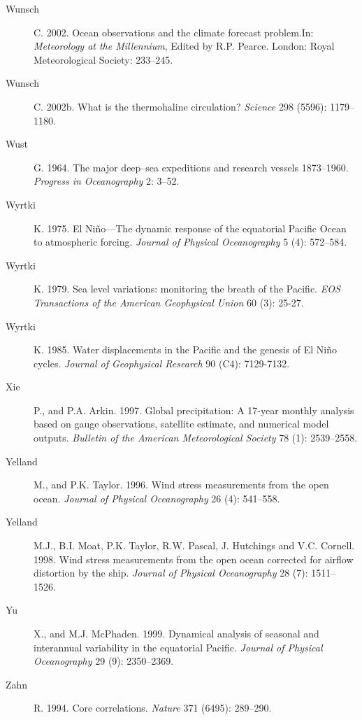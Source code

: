 \begin{description}
\item [Wunsch]C. 2002. Ocean observations and the climate forecast
  problem.In: \textit{Meteorology at the Millennium}, Edited by
  R.P. Pearce. London: Royal Meteorological Society: 233--245.

\item [Wunsch]C. 2002b. What is the thermohaline circulation?
  \textit{Science} 298 (5596): 1179--1180.

\item [Wust]G. 1964. The major deep--sea expeditions and research
  vessels 1873--1960. \textit{Progress in Oceanography} 2: 3--52.

\item [Wyrtki]K. 1975. El Ni\~{n}o---The dynamic response of the
  equatorial Pacific Ocean to atmospheric forcing. \textit{Journal of
    Physical Oceanography} 5 (4): 572--584.

\item [Wyrtki]K. 1979. Sea level variations: monitoring the breath of
  the Pacific. \textit{EOS Transactions of the American Geophysical
    Union} 60 (3): 25-27.

\item [Wyrtki]K. 1985. Water displacements in the Pacific and the
  genesis of El Ni\~{n}o cycles. \textit{Journal of Geophysical
    Research} 90 (C4): 7129-7132.

\item [Xie]P., and P.A. Arkin. 1997. Global precipitation: A 17-year
  monthly analysis based on gauge observations, satellite estimate,
  and numerical model outputs. \textit{ Bulletin of the American
    Meteorological Society} 78 (1): 2539--2558.

\item [Yelland]M., and P.K. Taylor. 1996. Wind stress measurements
  from the open ocean. \textit{Journal of Physical Oceanography} 26
  (4): 541--558.

\item [Yelland]M.J., B.I. Moat, P.K. Taylor, R.W. Pascal, J. Hutchings
  and V.C. Cornell. 1998. Wind stress measurements from the open ocean
  corrected for airflow distortion by the ship. \textit{Journal of
    Physical Oceanography} 28 (7): 1511--1526.

\item [Yu]X., and M.J. McPhaden. 1999. Dynamical analysis of seasonal
  and interannual variability in the equatorial
  Pacific. \textit{Journal of Physical Oceanography} 29 (9):
  2350--2369.

\item [Zahn]R. 1994. Core correlations. \textit{Nature} 371 (6495):
  289--290.

\end{description}

